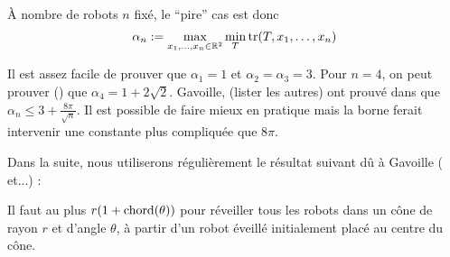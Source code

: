 À nombre de robots $n$ fixé, le ``pire'' cas est donc
  $$\alpha_n := \max_{x_1, \dots, x_n \in \mathbb{R}^2} \min_T \operatorname{tr}(T, x_1, \dots,
x_n)$$

Il est assez facile de prouver que  $\alpha_1 = 1$ et $\alpha_2 = \alpha_3 = 3$.
Pour $n=4$, on peut prouver (\cite{}) que $\alpha_4 = 1 + 2\sqrt{2}$.
Gavoille, (lister les autres) ont prouvé dans \cite{} que $\alpha_n \leq 3 +
\frac{8\pi}{\sqrt{n}}$. Il est possible de faire mieux en pratique mais la borne
ferait intervenir une constante plus compliquée que $8\pi$.

Dans la suite, nous utiliserons régulièrement le résultat suivant dû à Gavoille
( et...) :
\begin{theorem}[\cite{}]
  Il faut au plus $r(1 + \operatorname{chord}(\theta))$ pour réveiller tous les robots dans un
  cône de rayon $r$ et d'angle $\theta$, à partir d'un robot éveillé
  initialement placé au centre du cône.
\end{theorem}